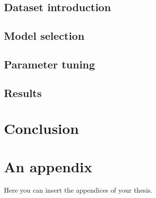 \documentclass[
  digital, %
  table,   %
  lof,     %
  lot,     %
]{fithesis3}
\begin{document}
\section{Dataset introduction}
\section{Model selection}
\section{Parameter tuning}
\section{Results}

\chapter{Conclusion}



  \printbibliography[heading=bibintoc] %

  \makeatletter\thesis@blocks@clear\makeatother
  \printindex

\appendix %
\chapter{An appendix}
Here you can insert the appendices of your thesis.
\end{document}
